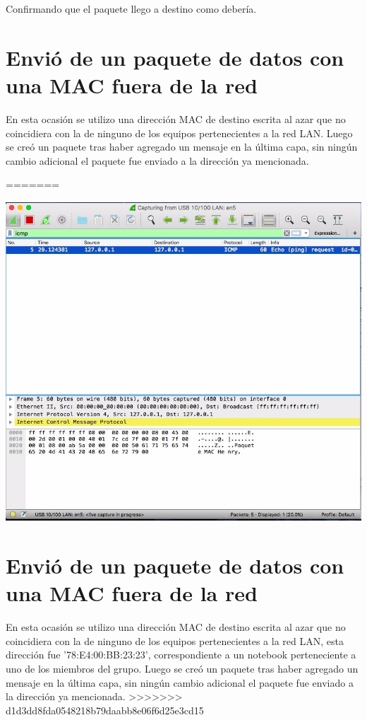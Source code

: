 \documentclass[spanish]{udpreport}
\begin{document}
Confirmando que el paquete llego a destino como debería.

\pagebreak

\section{Envió de un paquete de datos con una MAC fuera de la red}

En esta ocasión se utilizo una dirección MAC de destino escrita al azar que no coincidiera con la de ninguno de los equipos pertenecientes a la red LAN. Luego se creó un paquete tras haber agregado un mensaje en la última capa, sin ningún cambio adicional el paquete fue enviado a la dirección ya mencionada.

=======
\begin{center}
	\includegraphics[scale=.37]{imagenes/Hub/Test_2_Wireshark_a.jpg}
\end{center}
\newpage
\section{Envió de un paquete de datos con una MAC fuera de la red}

En esta ocasión se utilizo una dirección MAC de destino escrita al azar que no coincidiera con la de ninguno de los equipos pertenecientes a la red LAN, esta dirección fue ’78:E4:00:BB:23:23’, correspondiente a un notebook perteneciente a uno de los miembros del grupo. Luego se creó un paquete tras haber agregado un mensaje en la última capa, sin ningún cambio adicional el paquete fue enviado a la dirección ya mencionada.
>>>>>>> d1d3dd8fda0548218b79daabb8e06f6d25e3cd15
\end{document}
